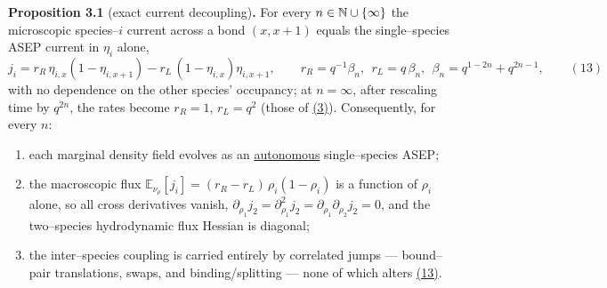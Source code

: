 \documentclass[11pt]{article}
\theoremstyle{plain}
\theoremstyle{definition}
\theoremstyle{remark}
\newcommand{\E}{\mathbb{E}}\newcommand{\PP}{\mathbb{P}}\newcommand{\dd}{\,\mathrm{d}}
\begin{document}
\label{prop_decouple}\noindent\textbf{Proposition 3.1} (exact current decoupling)\textbf{.} 
For every $n\in\mathbb{N}\cup\{\infty\}$ the microscopic species--$i$ current across a bond
$(x,x{+}1)$ equals the single--species ASEP current in $\eta_i$ alone,
\label{eq_jdecouple}
\begin{equation}
  j_i=r_R\,\eta_{i,x}(1-\eta_{i,x+1})-r_L\,(1-\eta_{i,x})\eta_{i,x+1},
  \qquad r_R=q^{-1}\beta_n,\ \ r_L=q\,\beta_n,\ \ \beta_n=q^{1-2n}+q^{2n-1},\qquad(13)
\end{equation}
with no dependence on the other species' occupancy; at $n=\infty$, after rescaling time
by $q^{2n}$, the rates become $r_R=1$, $r_L=q^2$ (those of \hyperref[eq_rates]{(3)}).
Consequently, for every $n$:
\begin{enumerate}
\item[\textup{(a)}] each marginal density field evolves as an \underline{autonomous}
single--species ASEP;
\item[\textup{(b)}] the macroscopic flux $\E_{\nu_\rho}[j_i]=(r_R-r_L)\,\rho_i(1-\rho_i)$
is a function of $\rho_i$ alone, so all cross derivatives vanish,
$\partial_{\rho_1}j_2=\partial^2_{\rho_1}j_2=\partial_{\rho_1}\partial_{\rho_2}j_2=0$,
and the two--species hydrodynamic flux Hessian is diagonal;
\item[\textup{(c)}] the inter--species coupling is carried entirely by correlated
jumps --- bound--pair translations, swaps, and binding/splitting --- none of which
alters \hyperref[eq_jdecouple]{(13)}.
\end{enumerate}
\par
\end{document}
